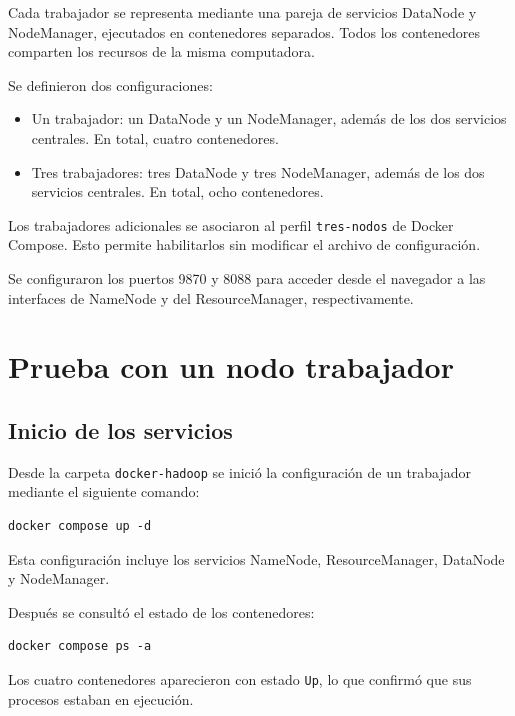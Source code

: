 Cada trabajador se representa mediante una pareja de 
servicios DataNode y NodeManager, ejecutados en contenedores 
separados. Todos los contenedores comparten los recursos 
de la misma computadora.

Se definieron dos configuraciones:

\begin{itemize}
    \item Un trabajador: un DataNode y un NodeManager, 
    además de los dos servicios centrales.
    En total, cuatro contenedores.
    
    \item Tres trabajadores: tres DataNode y tres NodeManager,
    además de los dos servicios centrales.
    En total, ocho contenedores.
\end{itemize}

Los trabajadores adicionales se asociaron al perfil 
\texttt{tres-nodos} de Docker Compose. Esto permite 
habilitarlos sin modificar el archivo de configuración.

Se configuraron los puertos 9870 y 8088 para acceder 
desde el navegador a las interfaces de NameNode y 
del ResourceManager, respectivamente.

\section{Prueba con un nodo trabajador}

\subsection{Inicio de los servicios}

Desde la carpeta \texttt{docker-hadoop} se inició la 
configuración de un trabajador mediante el siguiente comando:

\begin{lstlisting}[language={}]
    docker compose up -d
\end{lstlisting}

Esta configuración incluye los servicios NameNode, 
ResourceManager, DataNode y NodeManager.

Después se consultó el estado de los contenedores:

\begin{lstlisting}[language={}]
    docker compose ps -a
\end{lstlisting}

Los cuatro contenedores aparecieron con estado 
\texttt{Up}, lo que confirmó que sus procesos estaban en ejecución.

